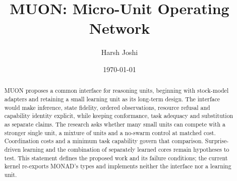 \documentclass[twocolumn]{article}
\title{MUON: Micro-Unit Operating Network}
\author{Harsh Joshi}
\date{\today}
\begin{document}
\maketitle

\begin{abstract}
MUON proposes a common interface for reasoning units, beginning with stock-model adapters and retaining a small learning unit as its long-term design. The interface would make inference, state fidelity, ordered observations, resource refusal and capability identity explicit, while keeping conformance, task adequacy and substitution as separate claims. The research asks whether many small units can compete with a stronger single unit, a mixture of units and a no-swarm control at matched cost. Coordination costs and a minimum task capability govern that comparison. Surprise-driven learning and the combination of separately learned cores remain hypotheses to test. This statement defines the proposed work and its failure conditions; the current kernel re-exports MONAD's types and implements neither the interface nor a learning unit.
\end{abstract}





\end{document}
